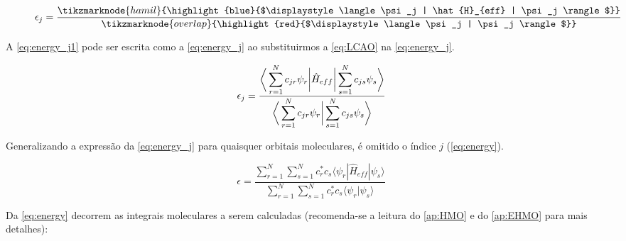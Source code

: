 \begin{figure}[htb]
    \vspace{3\baselineskip}
\begin{equation}
\label{eq:energy_j1}
        \epsilon_j = \frac{\tikzmarknode{hamil}{\highlight{blue}{$\displaystyle \langle \psi_j | \hat{H}_{eff} | \psi_j \rangle$}}}{\tikzmarknode{overlap}{\highlight{red}{$\displaystyle \langle \psi_j | \psi_j \rangle$}}}
\end{equation}
\vspace{2\baselineskip}
\end{figure}

A \autoref{eq:energy_j1} pode ser escrita como a \autoref{eq:energy_j} ao substituirmos a \autoref{eq:LCAO} na \autoref{eq:energy_j}.

\begin{equation}
\label{eq:energy_j}
    \epsilon_j = \frac{ \displaystyle \bigg{\langle} \sum_{r=1}^{N} c_{jr} \psi_r \bigg{|} \hat{H}_{eff} \bigg{|} \sum_{s=1}^{N} c_{js} \psi_s \bigg{\rangle}}{\displaystyle \bigg{\langle} \sum_{r=1}^{N} c_{jr} \psi_r \bigg{|} \sum_{s=1}^{N} c_{js} \psi_s \bigg{\rangle}}
\end{equation}

Generalizando a expressão da \autoref{eq:energy_j} para quaisquer orbitais moleculares, é omitido o índice $j$ (\autoref{eq:energy}).

\begin{equation}
\label{eq:energy}
    \epsilon = \frac{\displaystyle \sum_{r=1}^{N} \sum_{s=1}^{N} c^*_r c_s \langle \psi_r | \hat{H}_{eff} | \psi_s \rangle}{\displaystyle \sum_{r=1}^{N} \sum_{s=1}^{N} c^*_r c_s \langle \psi_r | \psi_s \rangle}
\end{equation}

Da \autoref{eq:energy} decorrem as integrais moleculares a serem calculadas (recomenda-se a leitura do \autoref{ap:HMO} e do \autoref{ap:EHMO} para mais detalhes):

